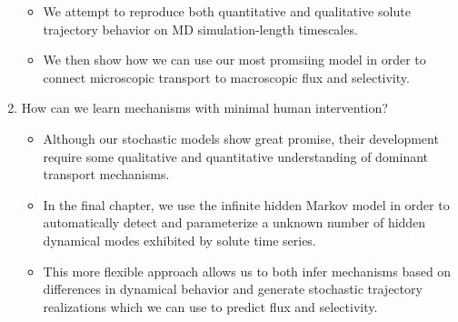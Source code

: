 \begin{enumerate}
\begin{itemize}
    	  \item We attempt to reproduce both quantitative and qualitative solute trajectory
    	  behavior on MD simulation-length timescales.
    	  \item We then show how we can use our most promsiing model in order to connect 
    	  microscopic transport to macroscopic flux and selectivity.
    	\end{itemize}
    \item How can we learn mechanisms with minimal human intervention?  %
    	\begin{itemize}
    	  \item Although our stochastic models show great promise, their development 
    	  require some qualitative and quantitative understanding of dominant transport
    	  mechanisms.
    	  \item In the final chapter, we use the infinite hidden Markov model in order
    	  to automatically detect and parameterize a unknown number of hidden dynamical modes
    	  exhibited by solute time series. 
    	  \item This more flexible approach allows us to both infer mechanisms based 
    	  on differences in dynamical behavior and generate stochastic trajectory realizations
    	  which we can use to predict flux and selectivity. 
    	\end{itemize}
  \end{enumerate} 
